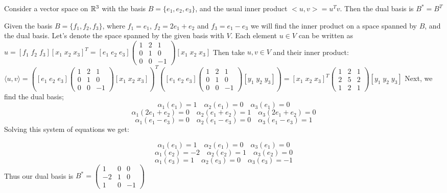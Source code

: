 \documentclass[11pt,a4paper]{report}
\begin{document}
\begin{Ex}
Consider a vector space on $\mathbb{R}^3$ with the basis $B = \{e_1, e_2, e_3\}$, and the usual inner product $<u,v> = u^T v$.
Then the dual basis is $B^{*} = B^T$
\end{Ex}
\begin{Ex}
  Given the basis $B=\{ f_1, f_2, f_3 \}$, where $f_1 = e_1$, $f_2 = 2 e_1+e_2$ and $f_3 = e_1 - e_3$ we will find the inner product on a space spanned by $B$,
   and the dual basis.
   \newline
   Let's denote the space spanned by the given basis with $V$. Each element $u \in V$ can be written as  
   $u = [f_1 \; f_2 \; f_3] [x_1 \; x_2 \; x_3]^T =
   [e_1 \; e_2 \; e_3] \begin{pmatrix} 1 & 2 & 1 \\ 0 & 1 & 0 \\ 0 & 0 & -1 \end{pmatrix} [x_1 \; x_2 \; x_3] $ Then take $u,v \in V$ and their inner product:
   $\langle u,v \rangle = ([e_1 \; e_2 \; e_3] \begin{pmatrix} 1 & 2 & 1 \\ 0 & 1 & 0 \\ 0 & 0 & -1 \end{pmatrix} [x_1 \; x_2 \; x_3])^T  ([e_1 \; e_2 \; e_3] \begin{pmatrix} 1 & 2 & 1 \\ 0 & 1 & 0 \\ 0 & 0 & -1 \end{pmatrix} [y_1 \; y_2 \; y_3]) =
   [x_1 \; x_2 \; x_3 ]^T \begin{pmatrix} 1 & 2 & 1 \\ 2 & 5 & 2 \\ 1 & 2 & 1 \end{pmatrix} [y_1 \; y_2 \; y_3] $
   Next, we find the dual basis;
   $$ \alpha_1(e_1) = 1 \quad \alpha_2(e_1) = 0 \quad \alpha_3(e_1) = 0 $$
   $$ \alpha_1(2e_1 + e_2) = 0 \quad \alpha_2(e_1 + e_2) = 1 \quad \alpha_3(2e_1 + e_2) = 0 $$
   $$ \alpha_1(e_1 - e_3) = 0 \quad \alpha_2(e_1 - e_3) = 0 \quad \alpha_3(e_1 - e_3) = 1 $$
   Solving this system of equations we get:

   $$ \alpha_1(e_1) = 1 \quad \alpha_2(e_1) = 0 \quad \alpha_3(e_1) = 0 $$
   $$ \alpha_1(e_2) = -2 \quad \alpha_2(e_2) = 1 \quad \alpha_3(e_2) = 0 $$
   $$ \alpha_1(e_3) = 1 \quad \alpha_2(e_3) = 0 \quad \alpha_3(e_3) = -1 $$
   Thus our dual basis is $B^{*} = \begin{pmatrix} 1 & 0 & 0 \\ -2 & 1 & 0 \\ 1 & 0 & -1 \end{pmatrix}$
\end{Ex}
\end{document}
